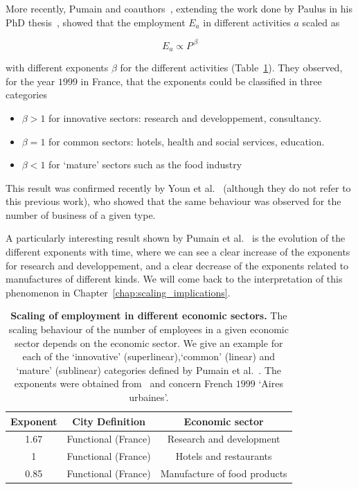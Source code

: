 More recently, Pumain and coauthors~\cite{Pumain:2006}, extending the work done
by Paulus in his PhD thesis~\cite{Paulus:2004}, showed that the
employment $E_a$ in different activities $a$ scaled as

\begin{equation}
    E_a \propto P^{\,\beta}
\end{equation}

with different exponents $\beta$ for the different activities
(Table~\ref{tab:employment}). They observed,
for the year $1999$ in France, that the exponents could be classified in three
categories

\begin{itemize}
    \item $\beta > 1$ for innovative sectors: research and developpement,
        consultancy.
    \item $\beta = 1$ for common sectors: hotels, health and social services,
        education.
    \item $\beta < 1$ for `mature' sectors such as the food industry
\end{itemize}

This result was confirmed recently by Youn et al.~\cite{Youn:2014} (although
they do not refer to this previous work), who showed that the same behaviour was
observed for the number of business of a given type. 

A particularly interesting result shown by Pumain et al.~\cite{Pumain:2006} is
the evolution of the different exponents with time, where we can see a clear
increase of the exponents for research and developpement, and a clear decrease
of the exponents related to manufactures of different kinds. We will come back
to the interpretation of this phenomenon in
Chapter~\ref{chap:scaling_implications}.\\

\begin{table}[!h]
    \centering
\begin{tabular}{|ccc|}
\hline
Exponent & City Definition & Economic sector\\
\hline
1.67 & Functional (France) & Research and development\\
1 & Functional (France) & Hotels and restaurants \\
0.85 & Functional (France) & Manufacture of food products\\
\hline
\end{tabular}
\caption{{\bf Scaling of employment in different economic sectors.} The scaling
behaviour of the number of employees in a given economic sector depends on the
economic sector. We give an example for each of the `innovative'
(superlinear),`common' (linear) and `mature' (sublinear) categories defined by
Pumain et al.~\cite{Pumain:2006}. The exponents were obtained from~\cite{Pumain:2006} and concern
French $1999$ `Aires urbaines'.} 
\label{tab:employment} 
\end{table}

